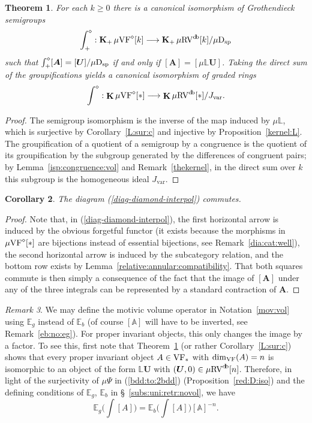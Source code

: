 \documentclass[12pt]{amsart}
\theoremstyle{plain}
\newtheorem{thm}{Theorem}[section]
\newtheorem{cor}[thm]{Corollary}
\theoremstyle{definition}
\theoremstyle{remark}
\newtheorem{rem}[thm]{Remark}
\numberwithin{equation}{section}
\theoremstyle{plain}
\newcommand{\VF}{\textup{VF}}
\newcommand{\RV}{\textup{RV}}
\newcommand{\A}{\mathds{A}}
\newcommand{\0}{\emptyset}
\newcommand{\bb}[1]{\mathbb{#1}}
\newcommand{\fun}{\longrightarrow}
\newcommand{\mVF}{{\mu}{\VF}}
\newcommand{\mgVF}{{\mu} {\VF}}
\newcommand{\mRV}{{\mu}{\RV}}
\newcommand{\mgRV}{{\mu}{\RV}}
\newcommand{\dsp}{\textup{D}_{\textup{sp}}}
\newcommand{\mispdb}{\mu \dsp}
\newcommand{\mL}{{\mu}{\bb L}}
\DeclareMathOperator{\gsk}{\mathbf{K}_+}
\DeclareMathOperator{\ggk}{\mathbf{K}}
\DeclareMathOperator{\db}{d \! b}
\begin{document}
\begin{thm}\label{main:prop}
For each $k \geq 0$ there is a canonical isomorphism of Grothendieck semigroups
\[
  \int^{\diamond}_+ : \gsk \mVF^\diamond[k] \fun \gsk  \mRV^{\db}[k] /  \mispdb
\]
such that $\int_{+}^{\diamond} [\bm A] = [\bm U]/  \mispdb$ if and only if $[\bm A] = [{\mL}\bm U]$. Taking the direct sum of the groupifications
yields a canonical isomorphism of graded rings
\[
  \int^{\diamond} : \ggk \mVF^\diamond[*] \fun \ggk \mRV^{\db}[*] / J_{\mathrm{var}}.
\]
\end{thm}
\begin{proof}
The semigroup isomorphism is the inverse of the map induced by $\mL$, which is surjective by Corollary~\ref{L:sur:c} and injective by Proposition~\ref{kernel:L}. The groupification of a quotient of a semigroup by a congruence is the quotient of its groupification by the subgroup generated by the differences of congruent pairs; by Lemma~\ref{isp:congruence:vol} and Remark~\ref{thekernel}, in the direct sum over $k$ this subgroup is the homogeneous ideal $J_{\mathrm{var}}$.
\end{proof}


\begin{cor}\label{db:to:novol}
The diagram (\ref{diag-diamond-interpol}) commutes.
\end{cor}
\begin{proof}
Note that, in (\ref{diag-diamond-interpol}),  the first horizontal arrow  is induced by the obvious forgetful functor (it exists
because the morphisms in $\mgVF^\diamond[*]$ are bijections instead of essential bijections, see Remark~\ref{dia:cat:well}), the second horizontal arrow is induced by the subcategory relation, and the bottom row exists by Lemma~\ref{relative:annular:compatibility}. That both squares commute is then simply a consequence of the fact that the image of $[\bm A]$ under any of the three integrals can be represented by a standard contraction of $\bm A$.
\end{proof}


\begin{rem}\label{eg:eb:factor}
We may define the motivic volume operator in Notation~\ref{mov:vol} using $\bb E_g$ instead of $\bb E_b$ (of course $[\A]$ will have to be inverted, see Remark~\ref{eb:no:eg}).
For proper invariant objects, this only changes the image by a factor. To see this, first note that  Theorem~\ref{main:prop} (or rather Corollary~\ref{L:sur:c}) shows that every proper invariant object $A \in \VF_*$ with $\dim_{\VF}(A) = n$ is isomorphic to an object of the form $\bb L \bm U$ with $(\bm U, 0) \in  \mgRV^{\db}[n]$. Therefore, in light of the surjectivity of ${\mu}\Psi$ in (\ref{bdd:to:2bdd}) (Proposition~\ref{red:D:iso}) and the defining conditions of $\bb E_g$, $\bb E_b$ in \S~\ref{subs:uni:retr:novol}, we have
\begin{equation}\label{off:fac:A}
\bb E_g \Big (\int [A] \Big ) = \bb E_b \Big (\int [A] \Big )[\A]^{-n}.
\end{equation}
\end{rem}
\end{document}
